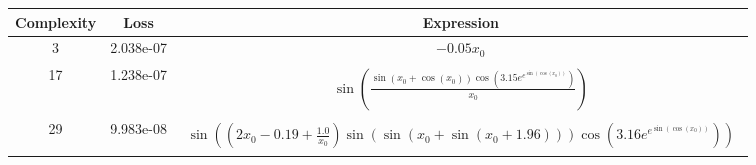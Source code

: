 \begin{center}
        \begin{tabular}{|c|c|c|}
        \hline
        Complexity & Loss & Expression \\
        \hline
        3 & 2.038e-07 & $\begin{aligned}- 0.05 x_{0}\end{aligned}$\\ \hline17 & 1.238e-07 & $\begin{aligned}\sin{\left(\frac{\sin{\left(x_{0} + \cos{\left(x_{0} \right)} \right)} \cos{\left(3.15 e^{e^{\sin{\left(\cos{\left(x_{0} \right)} \right)}}} \right)}}{x_{0}} \right)}\end{aligned}$\\ \hline29 & 9.983e-08 & $\begin{aligned}\sin{\left(\left(2 x_{0} - 0.19 + \frac{1.0}{x_{0}}\right) \sin{\left(\sin{\left(x_{0} + \sin{\left(x_{0} + 1.96 \right)} \right)} \right)} \cos{\left(3.16 e^{e^{\sin{\left(\cos{\left(x_{0} \right)} \right)}}} \right)} \right)}\end{aligned}$\\ \hline\end{tabular}
        \end{center}
        